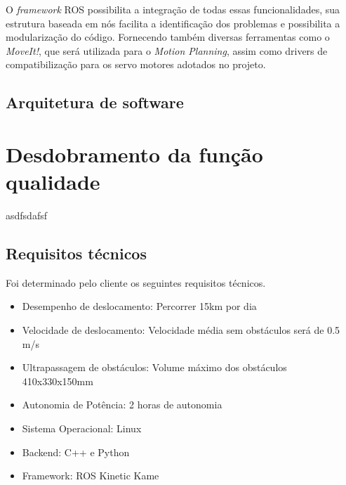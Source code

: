 O \textit{framework} ROS possibilita a integração de todas essas funcionalidades, sua estrutura baseada em nós facilita a identificação dos problemas e possibilita a modularização do código. Fornecendo também diversas ferramentas como o \textit{MoveIt!}, que será utilizada para o \textit{Motion Planning}, assim como drivers de compatibilização para os servo motores adotados no projeto.

\subsection{Arquitetura de software}
\label{ssec:arqs}

\section{Desdobramento da função qualidade}
\label{sec:qfd}
asdfsdafsf

\subsection{Requisitos técnicos}
\label{ssec:reqt}
Foi determinado pelo cliente os seguintes requisitos técnicos.
\begin{itemize}
	\item Desempenho de deslocamento: Percorrer 15km por dia
	\item Velocidade de deslocamento: Velocidade média sem obstáculos será de 0.5 m/s
	\item	Ultrapassagem de obstáculos: Volume máximo dos obstáculos 410x330x150mm
	\item	Autonomia de Potência: 2 horas de autonomia
	\item	Sistema Operacional: Linux
	\item	Backend: C++ e Python
	\item 	Framework: ROS Kinetic Kame

\end{itemize}

